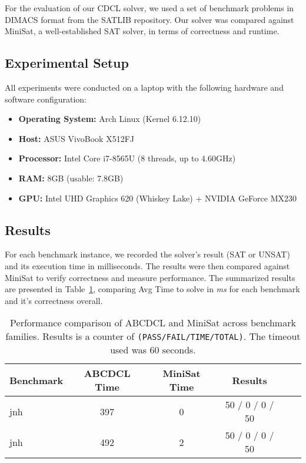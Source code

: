 \documentclass[a4paper,12pt]{article}
\begin{document}
For the evaluation of our CDCL solver, we used a set of benchmark problems in DIMACS
format from the SATLIB repository. Our solver was compared against MiniSat, a
well-established SAT solver, in terms of correctness and runtime.

\subsection{Experimental Setup}
All experiments were conducted on a laptop with the following hardware and software configuration:

\begin{itemize}
    \item \textbf{Operating System:} Arch Linux (Kernel 6.12.10)
    \item \textbf{Host:} ASUS VivoBook X512FJ
    \item \textbf{Processor:} Intel Core i7-8565U (8 threads, up to 4.60GHz)
    \item \textbf{RAM:} 8GB (usable: 7.8GB)
    \item \textbf{GPU:} Intel UHD Graphics 620 (Whiskey Lake) + NVIDIA GeForce MX230
\end{itemize}

\subsection{Results}
For each benchmark instance, we recorded the solver’s result (SAT or UNSAT) and its
execution time in milliseconds. The results were then compared against MiniSat to
verify correctness and measure performance. The summarized results are presented in
Table~\ref{tab:results}, comparing Avg Time to solve in \textit{ms} for each benchmark
and it's correctness overall.

\begin{table}[h]
    \centering
    \begin{tabular}{|l|c|c|c|c|c|}
        \hline
        \textbf{Benchmark} & \textbf{ABCDCL Time} & \textbf{MiniSat Time} & \textbf{Results } \\
        \hline
        jnh                & 397                  & 0                     & 50 / 0 / 0 / 50   \\
        jnh                & 492                  & 2                     & 50 / 0 / 0 / 50   \\

        \hline
    \end{tabular}
    \caption{Performance comparison of ABCDCL and MiniSat across benchmark families. Results is a
        counter of \texttt{(PASS/FAIL/TIME/TOTAL)}. The timeout used was $60$ seconds.}
    \label{tab:results}
\end{table}
\end{document}
